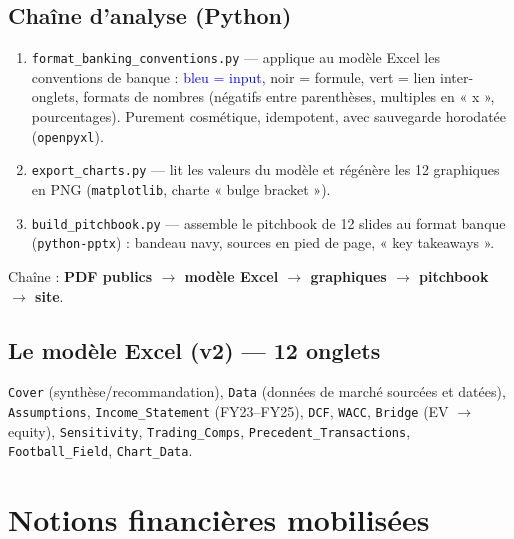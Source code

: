 \documentclass[11pt,a4paper]{article}
\begin{document}
\subsection{Chaîne d'analyse (Python)}
\begin{enumerate}
  \item \texttt{format\_banking\_conventions.py} — applique au modèle Excel les conventions de
        banque : \textcolor{blue}{bleu = input}, noir = formule, \textcolor{green!50!black}{vert = lien
        inter-onglets}, formats de nombres (négatifs entre parenthèses, multiples en « x »,
        pourcentages). Purement cosmétique, idempotent, avec sauvegarde horodatée
        (\texttt{openpyxl}).
  \item \texttt{export\_charts.py} — lit les valeurs du modèle et régénère les 12 graphiques en
        PNG (\texttt{matplotlib}, charte « bulge bracket »).
  \item \texttt{build\_pitchbook.py} — assemble le pitchbook de 12 slides au format banque
        (\texttt{python-pptx}) : bandeau navy, sources en pied de page, « key takeaways ».
\end{enumerate}
\noindent Chaîne : \textbf{PDF publics $\rightarrow$ modèle Excel $\rightarrow$ graphiques
$\rightarrow$ pitchbook $\rightarrow$ site}.

\subsection{Le modèle Excel (v2) — 12 onglets}
\texttt{Cover} (synthèse/recommandation), \texttt{Data} (données de marché sourcées et datées),
\texttt{Assumptions}, \texttt{Income\_Statement} (FY23–FY25), \texttt{DCF}, \texttt{WACC},
\texttt{Bridge} (EV $\rightarrow$ equity), \texttt{Sensitivity}, \texttt{Trading\_Comps},
\texttt{Precedent\_Transactions}, \texttt{Football\_Field}, \texttt{Chart\_Data}.

\section{Notions financières mobilisées}
\end{document}
